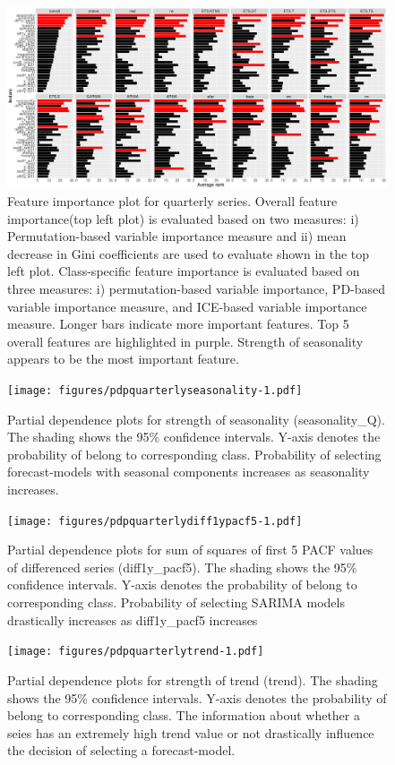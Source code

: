 \documentclass[11pt,a4paper,]{article}
\begin{document}
\begin{figure}
\centering
\includegraphics{figures/viquarterly-1.pdf}
\caption{\label{fig:viquarterly}Feature importance plot for quarterly series. Overall feature importance(top left plot) is evaluated based on two measures: i) Permutation-based variable importance measure and ii) mean decrease in Gini coefficients are used to evaluate shown in the top left plot. Class-specific feature importance is evaluated based on three measures: i) permutation-based variable importance, PD-based variable importance measure, and ICE-based variable importance measure. Longer bars indicate more important features. Top 5 overall features are highlighted in purple. Strength of seasonality appears to be the most important feature.}
\end{figure}

\begin{figure}
\centering
\texttt{[image: figures/pdpquarterlyseasonality-1.pdf]}
\caption{\label{fig:pdpquarterlyseasonality}Partial dependence plots for strength of seasonality (seasonality\_Q). The shading shows the 95\% confidence intervals. Y-axis denotes the probability of belong to corresponding class. Probability of selecting forecast-models with seasonal components increases as seasonality increases.}
\end{figure}

\begin{figure}
\centering
\texttt{[image: figures/pdpquarterlydiff1ypacf5-1.pdf]}
\caption{\label{fig:pdpquarterlydiff1ypacf5}Partial dependence plots for sum of squares of first 5 PACF values of differenced series (diff1y\_pacf5). The shading shows the 95\% confidence intervals. Y-axis denotes the probability of belong to corresponding class. Probability of selecting SARIMA models drastically increases as diff1y\_pacf5 increases}
\end{figure}

\begin{figure}
\centering
\texttt{[image: figures/pdpquarterlytrend-1.pdf]}
\caption{\label{fig:pdpquarterlytrend}Partial dependence plots for strength of trend (trend). The shading shows the 95\% confidence intervals. Y-axis denotes the probability of belong to corresponding class. The information about whether a seies has an extremely high trend value or not drastically influence the decision of selecting a forecast-model.}
\end{figure}
\end{document}
